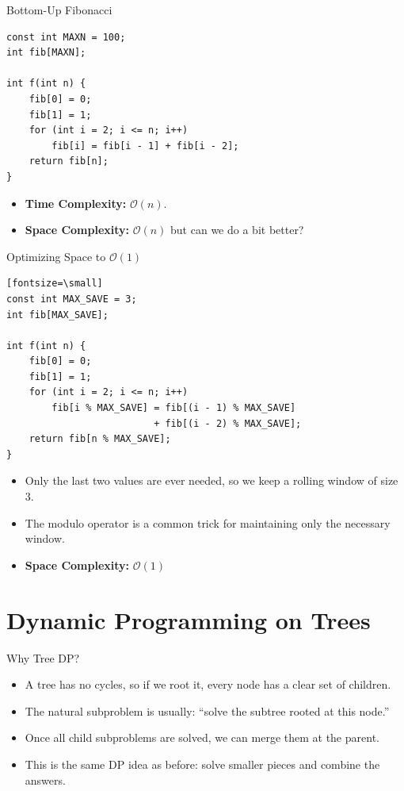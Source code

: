 \documentclass{beamer}
\begin{document}
\begin{frame}[fragile]{Bottom-Up Fibonacci}
\begin{Verbatim}[fontsize=\small]
const int MAXN = 100;
int fib[MAXN];

int f(int n) {
    fib[0] = 0;
    fib[1] = 1;
    for (int i = 2; i <= n; i++)
        fib[i] = fib[i - 1] + fib[i - 2];
    return fib[n];
}
\end{Verbatim}
    \vspace{0.5em}
    \begin{itemize}
        \item \textbf{Time Complexity:} $\mathcal{O}(n)$.
        \item \textbf{Space Complexity:} $\mathcal{O}(n)$ but can we do a bit better?
    \end{itemize}
\end{frame}

\begin{frame}[fragile]{Optimizing Space to $\mathcal{O}(1)$}
\begin{Verbatim}[fontsize=\small][fontsize=\small]
const int MAX_SAVE = 3;
int fib[MAX_SAVE];

int f(int n) {
    fib[0] = 0;
    fib[1] = 1;
    for (int i = 2; i <= n; i++)
        fib[i % MAX_SAVE] = fib[(i - 1) % MAX_SAVE]
                          + fib[(i - 2) % MAX_SAVE];
    return fib[n % MAX_SAVE];
}
\end{Verbatim}
    \vspace{0.5em}
    \begin{itemize}
        \item Only the last two values are ever needed, so we keep a rolling window of size 3.
        \item The modulo operator is a common trick for maintaining only the necessary window.
        \item \textbf{Space Complexity:} $\mathcal{O}(1)$
    \end{itemize}
\end{frame}

\section{Dynamic Programming on Trees}

\begin{frame}{Why Tree DP?}
    \begin{itemize}
        \item A tree has no cycles, so if we root it, every node has a clear
        set of children.
        \item The natural subproblem is usually: ``solve the subtree rooted at
        this node.''
        \item Once all child subproblems are solved, we can merge them at the
        parent.
        \item This is the same DP idea as before: solve smaller pieces and
        combine the answers.
    \end{itemize}
\end{frame}
\end{document}
